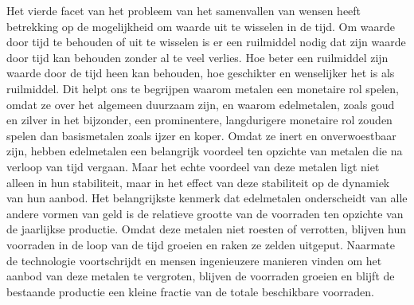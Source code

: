 \documentclass[
  a5paper,
  smalldemyvopaper,11pt,twoside,onecolumn,openright,extrafontsizes,
hidelinks]{memoir}
\begin{document}
Het vierde facet van het probleem van het samenvallen van wensen heeft
betrekking op de mogelijkheid om waarde uit te wisselen in de tijd. Om
waarde door tijd te behouden of uit te wisselen is er een ruilmiddel
nodig dat zijn waarde door tijd kan behouden zonder al te veel verlies.
Hoe beter een ruilmiddel zijn waarde door de tijd heen kan behouden, hoe
geschikter en wenselijker het is als ruilmiddel. Dit helpt ons te
begrijpen waarom metalen een monetaire rol spelen, omdat ze over het
algemeen duurzaam zijn, en waarom edelmetalen, zoals goud en zilver in
het bijzonder, een prominentere, langdurigere monetaire rol zouden
spelen dan basismetalen zoals ijzer en koper. Omdat ze inert en
onverwoestbaar zijn, hebben edelmetalen een belangrijk voordeel ten
opzichte van metalen die na verloop van tijd vergaan. Maar het echte
voordeel van deze metalen ligt niet alleen in hun stabiliteit, maar in
het effect van deze stabiliteit op de dynamiek van hun aanbod. Het
belangrijkste kenmerk dat edelmetalen onderscheidt van alle andere
vormen van geld is de relatieve grootte van de voorraden ten opzichte
van de jaarlijkse productie. Omdat deze metalen niet roesten of
verrotten, blijven hun voorraden in de loop van de tijd groeien en raken
ze zelden uitgeput. Naarmate de technologie voortschrijdt en mensen
ingenieuzere manieren vinden om het aanbod van deze metalen te
vergroten, blijven de voorraden groeien en blijft de bestaande productie
een kleine fractie van de totale beschikbare voorraden.
\end{document}
